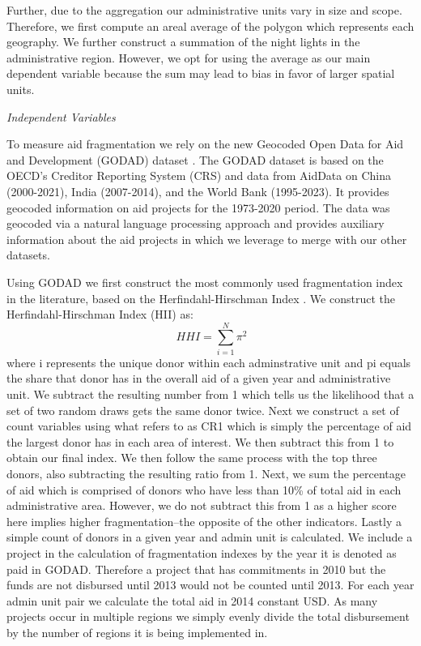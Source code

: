 \documentclass[11pt]{article}
\begin{document}
 Further, due to the aggregation our administrative units vary in size and scope. Therefore, we first compute an areal average of the polygon which represents each geography. We further construct a summation of the night lights in the administrative region. However, we opt for using the average as our main dependent variable because the sum may lead to bias in favor of larger spatial units\cite{bigsten_international_2015}.\par

\vspace{1cm}
\textit{Independent Variables}\par
\vspace{1cm}
To measure aid fragmentation we rely on the new Geocoded Open Data for Aid and Development (GODAD) dataset \cite{bomprezzi_wedded_2024}. 
The GODAD dataset is based on the OECD’s Creditor Reporting System (CRS) and data from AidData on China (2000-2021), India (2007-2014), and the World Bank (1995-2023). It provides geocoded information on aid projects for the 1973-2020 period. The data was geocoded via a natural language processing approach and provides auxiliary information about the aid projects in which we leverage to merge with our other datasets. 
        
Using GODAD we first construct the most commonly used fragmentation index in the literature, based on the Herfindahl-Hirschman Index \citep{knack_donor_2007}. We construct the Herfindahl-Hirschman Index (HII) as:
        \[ \ HHI = \sum_{i=1}^{N} \pi^2 \]
where i represents the unique donor within each adminstrative unit and pi equals the share that donor has in the overall aid of a given year and administrative unit. We subtract the resulting number from 1 which tells us the likelihood that a set of two random draws gets the same donor twice. Next we construct a set of count variables using what \cite{gehring_aid_2017} refers to as CR1 which is simply the percentage of aid the largest donor has in each area of interest. We then subtract this from 1 to obtain our final index. We then follow the same process with the top three donors, also subtracting the resulting ratio from 1. Next, we sum the percentage of aid which is comprised of donors who have less than 10\% of total aid in each administrative area. However, we do not subtract this from 1 as a higher score here implies higher fragmentation--the opposite of the other indicators. Lastly a simple count of donors in a given year and admin unit is calculated. We include a project in the calculation of fragmentation indexes by the year it is denoted as paid in GODAD. Therefore a project that has commitments in 2010 but the funds are not disbursed until 2013 would not be counted until 2013. For each year admin unit pair we calculate the total aid in 2014 constant USD. As many projects occur in multiple regions we simply evenly divide the total disbursement by the number of regions it is being implemented in.  
\end{document}
